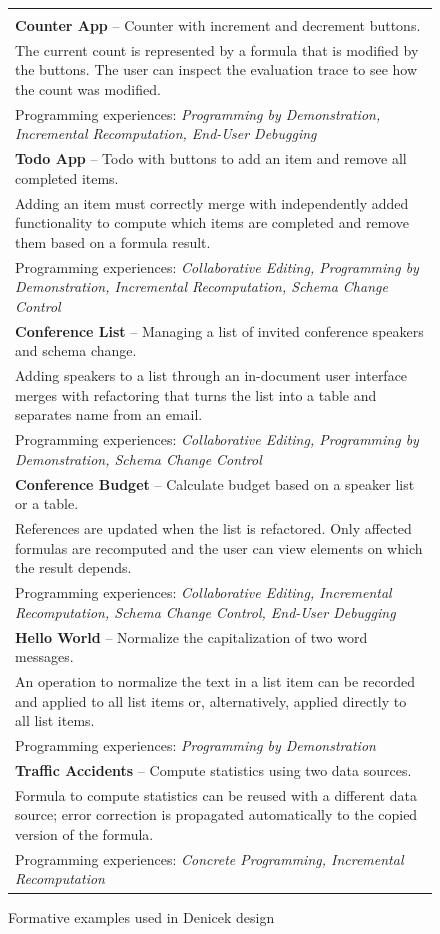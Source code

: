 \documentclass[sigconf]{acmart}
\begin{document}
\begin{figure}
\newcommand{\extablecol}[5]{
\small{\bfseries #1} #2\; --\; #3\\
\quad \footnotesize #4 \\[-0.2em]
\quad \footnotesize Programming experiences: \emph{#5} \\[0.6em]
}
\begin{tabular}{|l|}
\hline
\\[-1em]
\extablecol{Counter App}{\cite{kiss-2014-7guis}}
  {Counter with increment and decrement buttons.}
  {The current count is represented by a formula that is modified by the buttons.
  The user can inspect the evaluation trace to see how the count was modified.}
  {Programming by Demonstration, Incremental Recomputation, End-User Debugging}
\extablecol{Todo App}{\cite{osmani-2024-todomvc}}
  {Todo with buttons to add an item and remove all completed items.}
  {Adding an item must correctly merge with independently added functionality to
   compute which items are completed and remove them based on a formula result.}
  {Collaborative Editing, Programming by Demonstration, Incremental Recomputation, Schema Change Control}
\extablecol{Conference List}{\cite{edwards-2025-schema}}
  {Managing a list of invited conference speakers and schema change.}
  {Adding speakers to a list through an in-document user interface merges with
   refactoring that turns the list into a table and separates name from an email.}
  {Collaborative Editing, Programming by Demonstration, Schema Change Control}
\extablecol{Conference Budget}{\cite{edwards-2025-schema}}
  {Calculate budget based on a speaker list or a table.}
  {References are updated  when the list is refactored. Only affected formulas
   are recomputed and the user can view elements on which the result depends.}
  {Collaborative Editing, Incremental Recomputation, Schema Change Control, End-User Debugging}
\extablecol{Hello World}{\cite{miller-2001-simult}}
  {Normalize the capitalization of two word messages.}
  {An operation to normalize the text in a list item can be recorded and applied to
   all list items or, alternatively, applied directly to all list items.}
  {Programming by Demonstration}
\extablecol{Traffic Accidents}{\cite{edwards-2022-copypaste}}
  {Compute statistics using two data sources.}
  {Formula to compute statistics can be reused with a different data source;
   error correction is propagated automatically to the copied version of the formula.}
  {Concrete Programming, Incremental Recomputation}
\hline
\end{tabular}

\caption{Formative examples used in Denicek design}
\label{fig:examples}
\end{figure}
\end{document}
